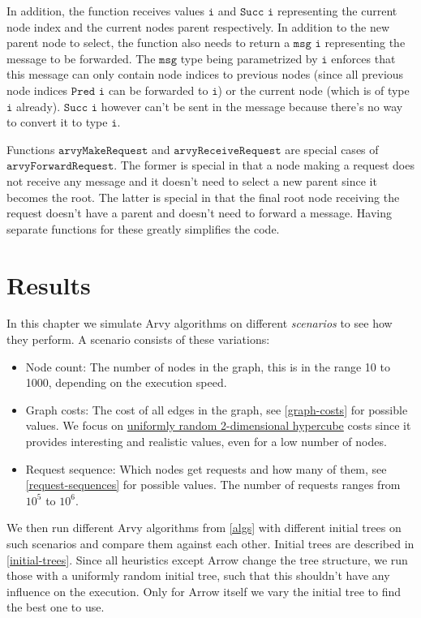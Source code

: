 \documentclass[a4paper, oneside]{discothesis}
\begin{document}
In addition, the function receives values $\texttt{i}$ and $\texttt{Succ i}$ representing the current node index and the current nodes parent respectively. In addition to the new parent node to select, the function also needs to return a $\texttt{msg i}$ representing the message to be forwarded. The $\texttt{msg}$ type being parametrized by $\texttt{i}$ enforces that this message can only contain node indices to previous nodes (since all previous node indices $\texttt{Pred i}$ can be forwarded to $\texttt{i}$) or the current node (which is of type $\texttt{i}$ already). $\texttt{Succ i}$ however can't be sent in the message because there's no way to convert it to type $\texttt{i}$.

Functions $\texttt{arvyMakeRequest}$ and $\texttt{arvyReceiveRequest}$ are special cases of $\texttt{arvyForwardRequest}$. The former is special in that a node making a request does not receive any message and it doesn't need to select a new parent since it becomes the root. The latter is special in that the final root node receiving the request doesn't have a parent and doesn't need to forward a message. Having separate functions for these greatly simplifies the code.

\chapter{Results}

In this chapter we simulate Arvy algorithms on different \textit{scenarios} to see how they perform. A scenario consists of these variations:
\begin{itemize}
\item Node count: The number of nodes in the graph, this is in the range 10 to 1000, depending on the execution speed.
\item Graph costs: The cost of all edges in the graph, see \autoref{graph-costs} for possible values. We focus on \hyperref[costs:cube]{uniformly random 2-dimensional hypercube} costs since it provides interesting and realistic values, even for a low number of nodes.
\item Request sequence: Which nodes get requests and how many of them, see \autoref{request-sequences} for possible values. The number of requests ranges from $10^5$ to $10^6$.
\end{itemize}

We then run different Arvy algorithms from \autoref{algs} with different initial trees on such scenarios and compare them against each other. Initial trees are described in \autoref{initial-trees}. Since all heuristics except Arrow change the tree structure, we run those with a uniformly random initial tree, such that this shouldn't have any influence on the execution. Only for Arrow itself we vary the initial tree to find the best one to use.
\end{document}
